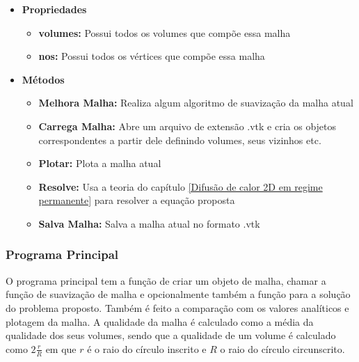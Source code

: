 \begin{itemize}
    \item \textbf{Propriedades}
    \begin{itemize}
        \item \textbf{volumes:} Possui todos os volumes que compõe essa malha
        \item \textbf{nos:} Possui todos os vértices que compõe essa malha
    \end{itemize}
    \item \textbf{Métodos}
    \begin{itemize}
        \item \textbf{Melhora Malha:} Realiza algum algoritmo de suavização da malha atual
        \item \textbf{Carrega Malha:} Abre um arquivo de extensão .vtk e cria os objetos correspondentes a partir dele definindo volumes, seus vizinhos etc.
        \item \textbf{Plotar:} Plota a malha atual
        \item \textbf{Resolve:} Usa a teoria do capítulo \ref{Difusão de calor 2D em regime permanente} para resolver a equação proposta
        \item \textbf{Salva Malha:} Salva a malha atual no formato .vtk
    \end{itemize}
\end{itemize}

\subsubsection{Programa Principal}
O programa principal tem a função de criar um objeto de malha, chamar a função de suavização de malha e opcionalmente também a função para a solução do problema proposto. Também é feito a comparação com os valores analíticos e plotagem da malha. A qualidade da malha é calculado como a média da qualidade dos seus volumes, sendo que a qualidade de um volume é calculado como $2\frac{r}{R}$ em que $r$ é o raio do círculo inscrito e $R$ o raio do círculo circunscrito.